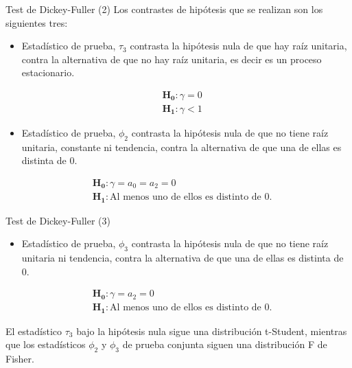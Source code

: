 \documentclass[
  ignorenonframetext,
]{beamer}
\providecommand{\tightlist}{%
  \setlength{\itemsep}{0pt}\setlength{\parskip}{0pt}}
\begin{document}
\begin{frame}{Test de Dickey-Fuller (2)}
\protect\hypertarget{test-de-dickey-fuller-2}{}
Los contrastes de hipótesis que se realizan son los siguientes tres:

\begin{itemize}
\tightlist
\item
  Estadístico de prueba, \(\tau_3\) contrasta la hipótesis nula de que
  hay raíz unitaria, contra la alternativa de que no hay raíz unitaria,
  es decir es un proceso estacionario.
\end{itemize}

\begin{align*}
& \mathbf{H_0} : \gamma = 0 \\
& \mathbf{H_1} : \gamma < 1
\end{align*}

\begin{itemize}
\tightlist
\item
  Estadístico de prueba, \(\phi_2\) contrasta la hipótesis nula de que
  no tiene raíz unitaria, constante ni tendencia, contra la alternativa
  de que una de ellas es distinta de 0.
\end{itemize}

\begin{align*}
& \mathbf{H_0} : \gamma = a_0 = a_2 = 0 \\
& \mathbf{H_1} : \text{Al menos uno de ellos es distinto de 0.}
\end{align*}
\end{frame}

\begin{frame}{Test de Dickey-Fuller (3)}
\protect\hypertarget{test-de-dickey-fuller-3}{}
\begin{itemize}
\tightlist
\item
  Estadístico de prueba, \(\phi_3\) contrasta la hipótesis nula de que
  no tiene raíz unitaria ni tendencia, contra la alternativa de que una
  de ellas es distinta de 0.
\end{itemize}

\begin{align*}
& \mathbf{H_0} : \gamma = a_2 = 0 \\
& \mathbf{H_1} : \text{Al menos uno de ellos es distinto de 0.}
\end{align*}

El estadístico \(\tau_3\) bajo la hipótesis nula sigue una distribución
t-Student, mientras que los estadísticos \(\phi_2\) y \(\phi_3\) de
prueba conjunta siguen una distribución F de Fisher.
\end{frame}
\end{document}
